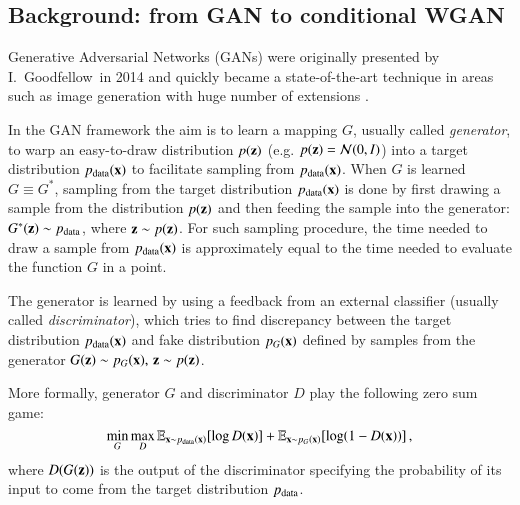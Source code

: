 \subsection{Background: from GAN to conditional WGAN}

Generative Adversarial Networks (GANs) were originally presented by I.~Goodfellow~\etal in 2014 \cite{goodfellow2014generative} and quickly became a state-of-the-art technique in areas such as image generation \cite{radford2015unsupervised} with huge number of extensions .


In the GAN framework the aim is to learn a mapping $G$, usually called \textit{generator}, to warp an easy-to-draw distribution $p(\mathbf{z})$ (e.g. $p(\mathbf{z}) = \mathcal{N}(0, I)$) into a target distribution $p_{\text{data}}(\mathbf{x})$ to facilitate sampling from $p_{\text{data}}(\mathbf{x})$. When $G$ is learned $G \equiv G^*$, sampling from the target distribution $p_{\text{data}}(\mathbf{x})$ is done by first drawing a sample from the distribution $p(\mathbf{z})$ and then feeding the sample into the generator: $G^*(\mathbf{z}) \sim p_{\text{data}}$, where $\mathbf{z} \sim p(\mathbf{z})$. For such sampling procedure, the time needed to draw a sample from $p_{\text{data}}(\mathbf{x})$ is approximately equal to the time needed to evaluate the function $G$ in a point.  

The generator is learned by using a feedback from an external classifier (usually called \textit{discriminator}), which tries to find discrepancy between the target distribution $p_{\text{data}}(\mathbf{x})$ and fake distribution $ p_{G} (\mathbf{x})$ defined by samples from the generator $G(\mathbf{z}) \sim  p_{G} (\mathbf{x}),\, \mathbf{z} \sim p(\mathbf{z})$. %



More formally, generator $G$ and discriminator $D$ play the following zero sum game: 
\begin{equation}\label{eq:gan}
\min_G \max_D \mathbb{E}_{\mathbf{x} \sim p_{\text{data}}(\mathbf{x})} [\log D(\mathbf{x})] + \mathbb{E}_{\mathbf{x} \sim  p_{G} (\mathbf{x})} [\log(1 - D(\mathbf{x}))]\, ,
\end{equation} 
where $D(G(\mathbf{z}))$ is the output of the discriminator specifying the probability of its input to come from the target distribution $p_{\text{data}}$.

